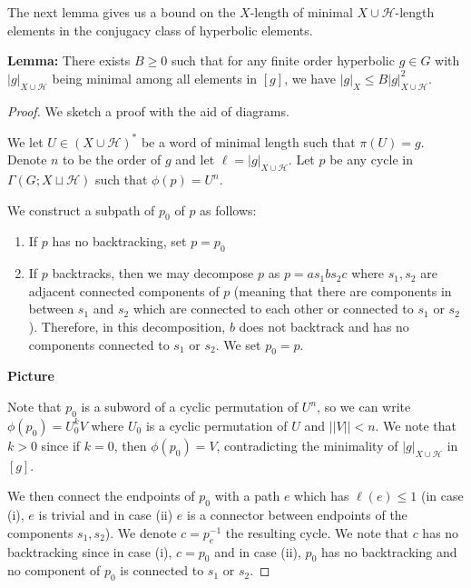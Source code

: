 \documentclass[12pt]{article}
\newcommand{\vs}{\vskip10pt}
\begin{document}
	The next lemma gives us a bound on the $X$-length of minimal $X \cup \mathcal{H}$-length elements in the conjugacy class of hyperbolic elements. 
	
	\vs 
	
	\textbf{Lemma: } There exists $B \geq 0$ such that for any finite order hyperbolic $g \in G$ with $\vert g \vert_{X \cup \mathcal{H}}$ being minimal among all elements in $[g]$, we have $\vert g \vert_X \leq B \vert g \vert_{X \cup \mathcal{H}}^2$. 
	
	\begin{proof}
		
		We sketch a proof with the aid of diagrams. 
		
		\vs 
		
		We let $U \in (X \cup \mathcal{H})^*$ be a word of minimal length such that $\pi(U) = g$. Denote $n$ to be the order of $g$ and let $\ell = \vert g \vert_{X \cup \mathcal{H}}$. Let $p$ be any cycle in $\Gamma(G; X \sqcup \mathcal{H})$ such that $\phi(p) = U^n$. 
		
		\vs 
		
		We construct a subpath of $p_0$ of $p$ as follows: 
		
		\begin{enumerate}[label = (\roman*)]
			\item If $p$ has no backtracking, set $p = p_0$
			\item If $p$ backtracks, then we may decompose $p$ as $p = a s_1 b s_2 c$ where $s_1, s_2$ are adjacent connected components of $p$ (meaning that there are components in between $s_1$ and $s_2$ which are connected to each other or connected to $s_1$ or $s_2$). Therefore, in this decomposition, $b$ does not backtrack and has no components connected to $s_1$ or $s_2$. We set $p_0 = p$. 
		\end{enumerate}
		\textbf{Picture}
		
		\vs
		
		Note that $p_0$ is a subword of a cyclic permutation of $U^n$, so we can write $\phi(p_0) = U_0^k V$ where $U_0$ is a cyclic permutation of $U$ and $\vert \vert V \vert \vert < n$. We note that $k > 0$ since if $k = 0$, then $\phi(p_0) = V$, contradicting the minimality of $\vert g \vert_{X \cup \mathcal{H}}$ in $[g]$. 
		
		\vs
		
		We then connect the endpoints of $p_0$ with a path $e$ which has $\ell(e) \leq 1$ (in case (i), $e$ is trivial and in case (ii) $e$ is a connector between endpoints of the components $s_1, s_2$). We denote $c = p_ e^{-1}$ the resulting cycle. We note that $c$ has no backtracking since in case (i), $c = p_0$ and in case (ii), $p_0$ has no backtracking and no component of $p_0$ is connected to $s_1$ or $s_2$. 
		

\end{proof}
\end{document}

